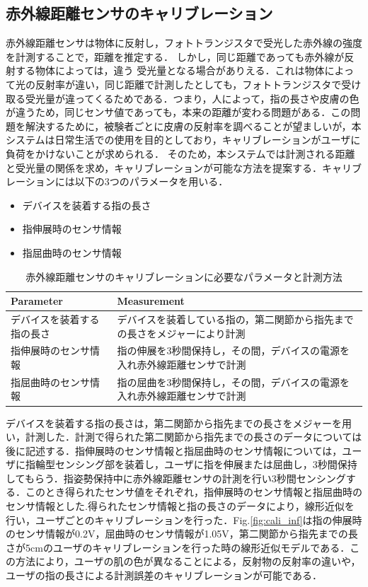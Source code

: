 \subsection*{赤外線距離センサのキャリブレーション}
赤外線距離センサは物体に反射し，フォトトランジスタで受光した赤外線の強度を計測することで，距離を推定する．
しかし，同じ距離であっても赤外線が反射する物体によっては，違う
受光量となる場合がありえる．これは物体によって光の反射率が違い，同じ距離で計測したとしても，フォトトランジスタで受け取る受光量が違ってくるためである．つまり，人によって，指の長さや皮膚の色が違うため，同じセンサ値であっても，本来の距離が変わる問題がある．この問題を解決するために，被験者ごとに皮膚の反射率を調べることが望ましいが，本システムは日常生活での使用を目的としており，キャリブレーションがユーザに負荷をかけないことが求められる．
そのため，本システムでは計測される距離と受光量の関係を求め，キャリブレーションが可能な方法を提案する．キャリブレーションには以下の3つのパラメータを用いる．
\begin{itemize}
 \item デバイスを装着する指の長さ
 \item 指伸展時のセンサ情報
 \item 指屈曲時のセンサ情報
\end{itemize}
\fi

\begin{table}[H]
  \caption{赤外線距離センサのキャリブレーションに必要なパラメータと計測方法}
  \label{table:cali_inf}
  \centering
  \begin{tabular}{ll}
    \hline
    Parameter &  Measurement  \\
    \hline \hline
デバイスを装着する指の長さ&
デバイスを装着している指の，第二関節から指先までの長さをメジャーにより計測\\

指伸展時のセンサ情報&
指の伸展を3秒間保持し，その間，デバイスの電源を入れ赤外線距離センサで計測\\

指屈曲時のセンサ情報&
指の屈曲を3秒間保持し，その間，デバイスの電源を入れ赤外線距離センサで計測\\

    \hline
  \end{tabular}
\end{table}

デバイスを装着する指の長さは，第二関節から指先までの長さをメジャーを用い，計測した．計測で得られた第二関節から指先までの長さのデータについては後に記述する．指伸展時のセンサ情報と指屈曲時のセンサ情報については，ユーザに指輪型センシング部を装着し，ユーザに指を伸展または屈曲し，3秒間保持してもらう．指姿勢保持中に赤外線距離センサの計測を行い3秒間センシングする．このとき得られたセンサ値をそれぞれ，指伸展時のセンサ情報と指屈曲時のセンサ情報とした.得られたセンサ情報と指の長さのデータにより，線形近似を行い，ユーザごとのキャリブレーションを行った．Fig.\ref{fig:cali_inf}は指の伸展時のセンサ情報が0.2V，屈曲時のセンサ情報が1.05V，第二関節から指先までの長さが5cmのユーザのキャリブレーションを行った時の線形近似モデルである．この方法により，ユーザの肌の色が異なることによる，反射物の反射率の違いや，ユーザの指の長さによる計測誤差のキャリブレーションが可能である．

